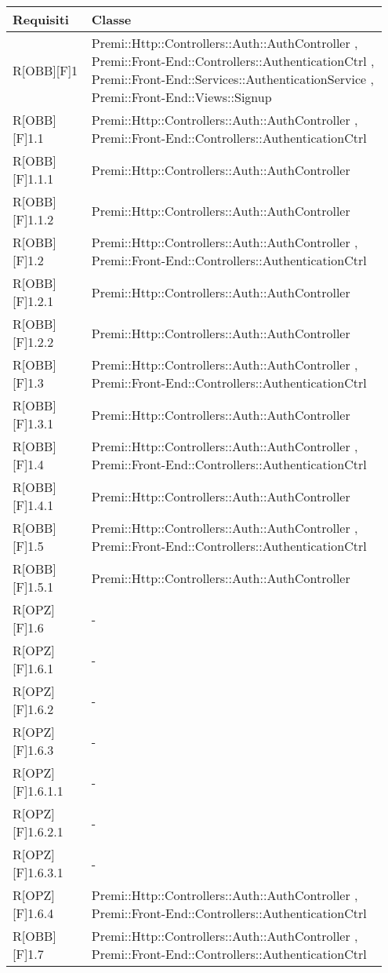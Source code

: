 \begin{table}[h]
	\begin{center}
		\begin{tabular}{|p{0.2\linewidth}|p{0.75\linewidth}|}
			\toprule
			\textbf{Requisiti} & \textbf{Classe}\\
		\midrule
			R[OBB][F]1 & Premi::Http::Controllers::Auth::AuthController , Premi::Front-End::Controllers::AuthenticationCtrl , Premi::Front-End::Services::AuthenticationService , Premi::Front-End::Views::Signup\\
		\midrule
			R[OBB][F]1.1 & Premi::Http::Controllers::Auth::AuthController , Premi::Front-End::Controllers::AuthenticationCtrl\\
		\midrule
			R[OBB][F]1.1.1 & Premi::Http::Controllers::Auth::AuthController\\
		\midrule
			R[OBB][F]1.1.2 & Premi::Http::Controllers::Auth::AuthController\\
		\midrule
			R[OBB][F]1.2 & Premi::Http::Controllers::Auth::AuthController , Premi::Front-End::Controllers::AuthenticationCtrl\\
		\midrule
			R[OBB][F]1.2.1 & Premi::Http::Controllers::Auth::AuthController\\
		\midrule
			R[OBB][F]1.2.2 & Premi::Http::Controllers::Auth::AuthController\\
		\midrule
			R[OBB][F]1.3 & Premi::Http::Controllers::Auth::AuthController , Premi::Front-End::Controllers::AuthenticationCtrl\\
		\midrule
			R[OBB][F]1.3.1 & Premi::Http::Controllers::Auth::AuthController\\
		\midrule
			R[OBB][F]1.4 & Premi::Http::Controllers::Auth::AuthController , Premi::Front-End::Controllers::AuthenticationCtrl\\
		\midrule
			R[OBB][F]1.4.1 & Premi::Http::Controllers::Auth::AuthController\\
		\midrule
			R[OBB][F]1.5 & Premi::Http::Controllers::Auth::AuthController , Premi::Front-End::Controllers::AuthenticationCtrl\\
		\midrule
			R[OBB][F]1.5.1 & Premi::Http::Controllers::Auth::AuthController\\
		\midrule
			R[OPZ][F]1.6 & -\\
		\midrule
			R[OPZ][F]1.6.1 & -\\
		\midrule
			R[OPZ][F]1.6.2 & -\\
		\midrule
			R[OPZ][F]1.6.3 & -\\
		\midrule
			R[OPZ][F]1.6.1.1 & -\\
		\midrule
			R[OPZ][F]1.6.2.1 & -\\
		\midrule
			R[OPZ][F]1.6.3.1 & -\\
		\midrule
			R[OPZ][F]1.6.4 & Premi::Http::Controllers::Auth::AuthController , Premi::Front-End::Controllers::AuthenticationCtrl\\
		\midrule
			R[OBB][F]1.7 & Premi::Http::Controllers::Auth::AuthController , Premi::Front-End::Controllers::AuthenticationCtrl\\
		
		\bottomrule
	\end{tabular}
\end{center}
\end{table}


